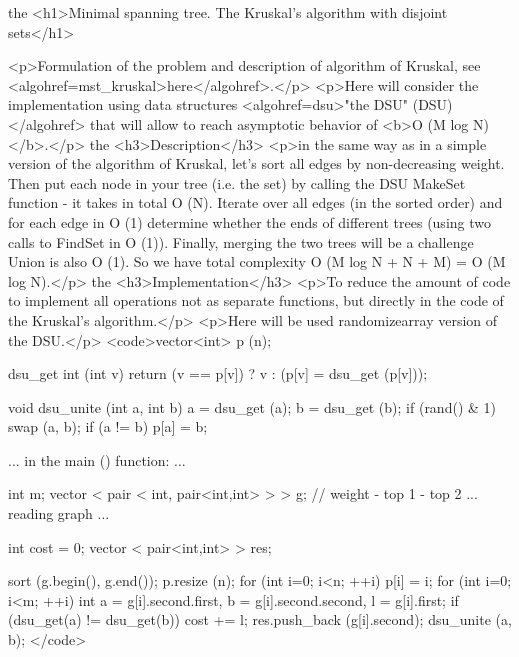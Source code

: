 the <h1>Minimal spanning tree. The Kruskal's algorithm with disjoint sets</h1>

<p>Formulation of the problem and description of algorithm of Kruskal, see <algohref=mst_kruskal>here</algohref>.</p>
<p>Here will consider the implementation using data structures <algohref=dsu>"the DSU" (DSU)</algohref> that will allow to reach asymptotic behavior of <b>O (M log N)</b>.</p>
the <h3>Description</h3>
<p>in the same way as in a simple version of the algorithm of Kruskal, let's sort all edges by non-decreasing weight. Then put each node in your tree (i.e. the set) by calling the DSU MakeSet function - it takes in total O (N). Iterate over all edges (in the sorted order) and for each edge in O (1) determine whether the ends of different trees (using two calls to FindSet in O (1)). Finally, merging the two trees will be a challenge Union is also O (1). So we have total complexity O (M log N + N + M) = O (M log N).</p>
the <h3>Implementation</h3>
<p>To reduce the amount of code to implement all operations not as separate functions, but directly in the code of the Kruskal's algorithm.</p>
<p>Here will be used randomizearray version of the DSU.</p>
<code>vector<int> p (n);

dsu_get int (int v) {
return (v == p[v]) ? v : (p[v] = dsu_get (p[v]));
}

void dsu_unite (int a, int b) {
a = dsu_get (a);
b = dsu_get (b);
if (rand() & 1)
swap (a, b);
if (a != b)
p[a] = b;
}

... in the main () function: ...

int m;
vector < pair < int, pair<int,int> > > g; // weight - top 1 - top 2
... reading graph ...

int cost = 0;
vector < pair<int,int> > res;

sort (g.begin(), g.end());
p.resize (n);
for (int i=0; i<n; ++i)
p[i] = i;
for (int i=0; i<m; ++i) {
int a = g[i].second.first, b = g[i].second.second, l = g[i].first;
if (dsu_get(a) != dsu_get(b)) {
cost += l;
res.push_back (g[i].second);
dsu_unite (a, b);
}
}</code>